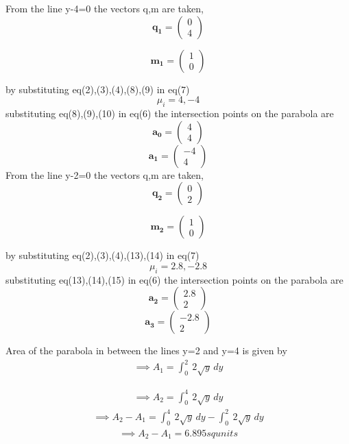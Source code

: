 \documentclass[journal,10pt,twocolumn]{article}
\let\vec\mathbf
\newcommand{\myvec}[1]{\ensuremath{\begin{pmatrix}#1\end{pmatrix}}}
\begin{document}
From the line y-4=0 the vectors q,m are taken,
\begin{equation}
\vec{q_1}=\myvec{0\\4}
\end{equation}

\begin{equation}
\vec{m_1}=\myvec{1\\0}
\end{equation}

by substituting eq(2),(3),(4),(8),(9) in eq(7)
\begin{equation}
\mu_i=4,-4
\end{equation}
substituting eq(8),(9),(10) in eq(6) the intersection points on the parabola are
\begin{equation}
\vec{a_0}=\myvec{4\\4}
\end{equation}
\begin{equation}
\vec{a_1}=\myvec{-4\\4}
\end{equation}
From the line y-2=0 the vectors q,m are taken,
\begin{equation}
\vec{q_2}=\myvec{0\\2}
\end{equation}

\begin{equation}
\vec{m_2}=\myvec{1\\0}
\end{equation}

by substituting eq(2),(3),(4),(13),(14) in eq(7)
\begin{equation}
\mu_i=2.8,-2.8
\end{equation}
substituting eq(13),(14),(15) in eq(6) the intersection points on the parabola are
\begin{equation}
\vec{a_2}=\myvec{2.8\\2}
\end{equation}
\begin{equation}
\vec{a_3}=\myvec{-2.8\\2}
\end{equation}

Area of the parabola in between the lines y=2 and y=4 is given by
\begin{align}
\implies A_1=\int_{0}^{2} \ 2\sqrt{y} \,dy
\end{align}

\begin{align}
\implies A_2=\int_{0}^{4} \ 2\sqrt{y} \,dy
\end{align}
\begin{align}
\implies A_2- A_1=\int_{0}^{4} \ 2\sqrt{y} \,dy-\int_{0}^{2} \ 2\sqrt{y} \,dy
\end{align}
\begin{align}
\implies A_2- A_1=6.895 sq units
\end{align}
\end{document}
